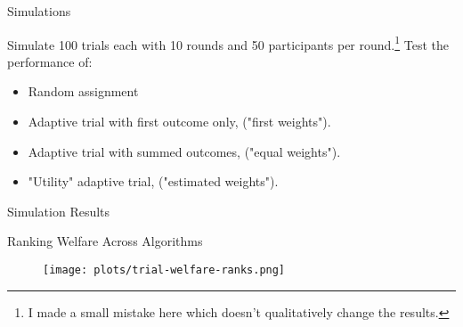 \documentclass[aspectratio=169,xcolor=dvipsnames]{beamer}
\begin{document}
\begin{frame}[label=sims]{Simulations}

    Simulate 100 trials each with 10 rounds and 50 participants per round.\footnote{I made a 
    small mistake here which doesn't qualitatively change the results.}
    Test the performance of:

    \begin{itemize}
        \item Random assignment
        \item Adaptive trial with first outcome only, ("first weights").
        \item Adaptive trial with summed outcomes, ("equal weights").
        \item "Utility" adaptive trial, ("estimated weights").
    \end{itemize}
    \hyperlink{sim-setup}{}

\end{frame}


\begin{frame}{Simulation Results}
    
\end{frame}


\begin{frame}{Ranking Welfare Across Algorithms}

\begin{figure}[htbp]
    \centering
    \texttt{[image: plots/trial-welfare-ranks.png]} 
\end{figure}    
\end{frame}




\end{document}

